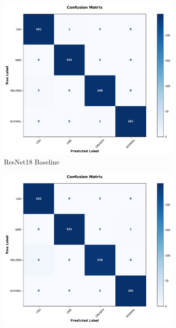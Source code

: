 \documentclass[preprint,12pt]{elsarticle}
\begin{document}
\begin{figure}[!t]
\centering
\begin{subfigure}[b]{0.24\columnwidth}
\centering
\includegraphics[width=\columnwidth]{fig/cm/roct/roct_resnet18.png}
\caption{ResNet18 Baseline}
\label{fig:confusion_baseline_roct}
\end{subfigure}
\hfill
\begin{subfigure}[b]{0.24\columnwidth}
\centering
\includegraphics[width=\columnwidth]{fig/cm/roct/roct_no_afd_mfe_msf.png}

\end{subfigure}
\end{figure}
\end{document}
